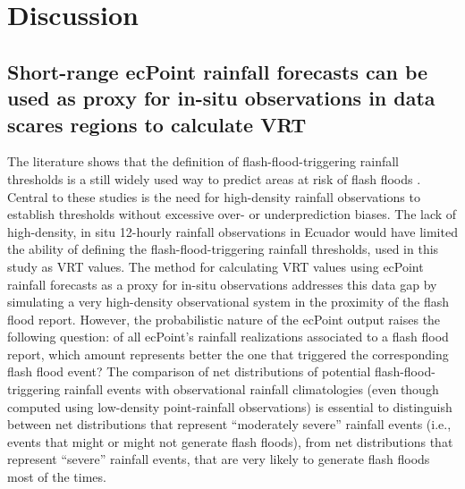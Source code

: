 \documentclass[techmemo]{ecmwfrep}%
\begin{document}
\section{Discussion}
\label{sec:Discussion}

\subsection{Short-range ecPoint rainfall forecasts can be used as proxy for in-situ observations in data scares regions to calculate VRT}

The literature shows that the definition of flash-flood-triggering rainfall thresholds is a still widely used way to predict areas at risk of flash floods \citep{Ma2021, Papagiannaki2015, RamosFilho2021}. Central to these studies is the need for high-density rainfall observations to establish thresholds without excessive over- or underprediction biases. The lack of high-density, in situ 12-hourly rainfall observations in Ecuador would have limited the ability of defining the flash-flood-triggering rainfall thresholds, used in this study as VRT values. The method for calculating VRT values using ecPoint rainfall forecasts as a proxy for in-situ observations addresses this data gap by simulating a very high-density observational system in the proximity of the flash flood report. However, the probabilistic nature of the ecPoint output raises the following question: of all ecPoint’s rainfall realizations associated to a flash flood report, which amount represents better the one that triggered the corresponding flash flood event? The comparison of net distributions of potential flash-flood-triggering rainfall events with observational rainfall climatologies (even though computed using low-density point-rainfall observations) is essential to distinguish between net distributions that represent “moderately severe” rainfall events (i.e., events that might or might not generate flash floods), from net distributions that represent “severe” rainfall events, that are very likely to generate flash floods most of the times.
\end{document}
